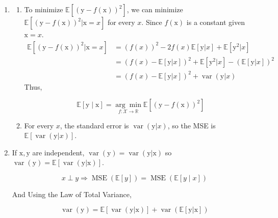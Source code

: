 \documentclass[a4paper]{article}
\begin{document}
\begin{enumerate}
\begin{enumerate}
  \item \begin{enumerate}
    \item To minimize $\mathbb{E}\left[(\mathrm{y}-
    f(\mathrm{x}))^2\right]$, we can minimize $\mathbb{E}\left[(\mathrm{y}-
    f(\mathrm{x}))^2 | \mathrm{x} = x\right]$ for every $x$. Since $f(\mathrm{x})$ is a constant given $\mathrm{x} = x$. \begin{equation}
      \begin{aligned}
      \mathbb{E}\left[(\mathrm{y}-
    f(\mathrm{x}))^2 | \mathrm{x}  = x\right] & = (f(x))^2 - 2f(x) \mathbb{E}\left[\mathrm{y}|x\right]  + \mathbb{E}\left[\mathrm{y}^2|x\right] \\
    & = (f(x)- \mathbb{E}\left[\mathrm{y}|x\right])^2 +  \mathbb{E}\left[\mathrm{y}^2|x\right] - (\mathbb{E}\left[\mathrm{y}|x\right])^2 \\
    & = (f(x)- \mathbb{E}\left[\mathrm{y}|x\right])^2 + \operatorname{var}(\mathrm{y} | x)
      \end{aligned}
    \end{equation}
    Thus,

    \begin{equation}
      \mathbb{E}[\mathrm{y} \mid \mathrm{x}]=\underset{f:\mathcal{X} \to \mathbb{R}}{\arg \min } \mathbb{E}\left[(\mathrm{y}-f(\mathrm{x}))^{2}\right]
    \end{equation}

  \item For every $x$, the standard error is $\operatorname{var}(\mathrm{y}|x)$, so the MSE is $\mathbb{E}[\operatorname{var}(\mathrm{y}|x)]$.
  \end{enumerate}

  \item If $\mathrm{x},\mathrm{y}$ are independent, $\operatorname{var}(\mathrm{y}) =\operatorname{var}(\mathrm{y}|\mathrm{x})$ so $\operatorname{var}(\mathrm{y}) = \mathbb{E}\left[\operatorname{var}(\mathrm{y}|\mathrm{x})\right]$.
  
  \begin{equation}
    x \perp y \Longrightarrow \operatorname{MSE}(\mathbb{E}[y])=\operatorname{MSE}(\mathbb{E}[y \mid x])
  \end{equation}

  And Using the Law of Total Variance, 

  \begin{equation}
    \operatorname{var}(\mathrm{y}) = \mathbb{E}\left[\operatorname{var}(\mathrm{y}|\mathrm{x})\right] + \operatorname{var} (\mathbb{E}\left[\mathrm{y}|\mathrm{x}\right])
  \end{equation}


\end{enumerate}
\end{enumerate}
\end{document}
